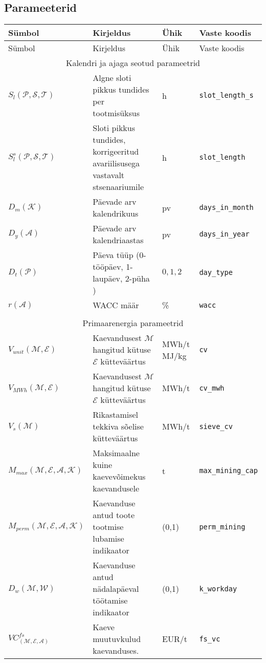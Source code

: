 \begin{landscape}
\section{Parameeterid}
\label{app:parameetrid}
\small
\begin{longtable}{l l l l}
Sümbol & Kirjeldus & Ühik & Vaste koodis\\
\hline
\endfirsthead

Sümbol & Kirjeldus & Ühik & Vaste koodis\\
\hline
\endhead

\multicolumn{4}{c}{Kalendri ja ajaga seotud parameetrid} \\
$S_l(\mathcal{P}, \mathcal{S},\mathcal{T})$     & Algne sloti pikkus tundides per tootmisüksus & h & \texttt{slot\_length\_s} \\
$S^s_l(\mathcal{P}, \mathcal{S}, \mathcal{T})$  & Sloti pikkus tundides, korrigeeritud avariilisusega vastavalt stsenaariumile & h & \texttt{slot\_length} \\
$D_m(\mathcal{K})$ & Päevade arv kalendrikuus   & pv & \texttt{days\_in\_month} \\
$D_y(\mathcal{A})$ & Päevade arv kalendriaastas & pv & \texttt{days\_in\_year} \\
$D_t(\mathcal{P})$ & Päeva tüüp (0-tööpäev, 1-laupäev, 2-püha )& ${0,1,2}$ & \texttt{day\_type} \\
$r(\mathcal{A})$ & WACC määr & \% & \texttt{wacc} \\

\\ \multicolumn{4}{c}{Primaarenergia parameetrid} \\
$\mathit{V}_{unit}(\mathcal{M}, \mathcal{E})$ & Kaevandusest $\mathcal{M}$ hangitud kütuse $\mathcal{E}$ kütteväärtus  & MWh/t MJ/kg& \texttt{cv}\\
$\mathit{V}_{MWh}(\mathcal{M}, \mathcal{E}) $ & Kaevandusest $\mathcal{M}$ hangitud kütuse $\mathcal{E}$ kütteväärtus  & MWh/t      & \texttt{cv\_mwh}\\
$\mathit{V}_s(\mathcal{M})$                   & Rikastamisel tekkiva sõelise kütteväärtus                              & MWh/t      & \texttt{sieve\_cv} \\ 

$\mathit{M}_{max}(\mathcal{M}, \mathcal{E},\mathcal{A}, \mathcal{K})$ & Maksimaalne kuine kaevevõimekus kaevandusele & t & \texttt{max\_mining\_cap} \\
$\mathit{M}_{perm}(\mathcal{M}, \mathcal{E},\mathcal{A}, \mathcal{K})$& Kaevanduse antud toote tootmise lubamise indikaator &(0,1)& \texttt{perm\_mining} \\
$\mathit{D}_w(\mathcal{M}, \mathcal{W})$ & Kaevanduse antud nädalapäeval töötamise indikaator &(0,1)& \texttt{k\_workday} \\
$\mathit{VC}^{fs}_(\mathcal{M}, \mathcal{E}, \mathcal{A})$ & Kaeve muutuvkulud kaevanduses. & EUR/t & \texttt{fs\_vc} \\


\end{longtable}
\end{landscape}
